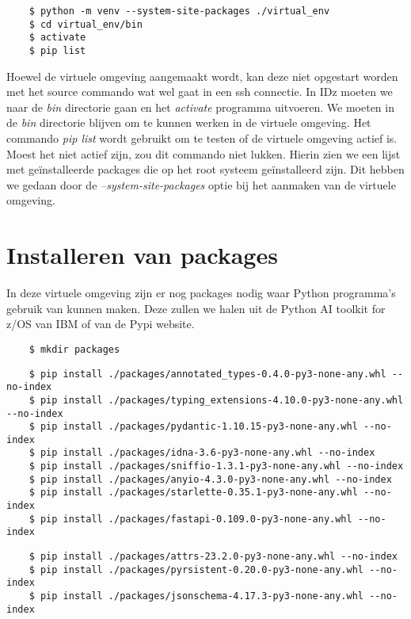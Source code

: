 \begin{lstlisting}
    $ python -m venv --system-site-packages ./virtual_env
    $ cd virtual_env/bin
    $ activate
    $ pip list
\end{lstlisting}

Hoewel de virtuele omgeving aangemaakt wordt, kan deze niet opgestart worden met het source commando wat wel gaat in een ssh connectie. In IDz moeten we naar de \textit{bin} directorie gaan en het \textit{activate} programma uitvoeren. We moeten in de \textit{bin} directorie blijven om te kunnen werken in de virtuele omgeving.
Het commando \textit{pip list} wordt gebruikt om te testen of de virtuele omgeving actief is. Moest het niet actief zijn, zou dit commando niet lukken. Hierin zien we een lijst met geïnstalleerde packages die op het root systeem geïnstalleerd zijn. Dit hebben we gedaan door de \textit{--system-site-packages} optie bij het aanmaken van de virtuele omgeving.

\section{Installeren van packages}
In deze virtuele omgeving zijn er nog packages nodig waar Python programma's gebruik van kunnen maken. Deze zullen we halen uit de Python AI toolkit for z/OS van IBM of van de Pypi website.

\begin{lstlisting}
    $ mkdir packages
\end{lstlisting}

\begin{lstlisting}
    $ pip install ./packages/annotated_types-0.4.0-py3-none-any.whl --no-index
    $ pip install ./packages/typing_extensions-4.10.0-py3-none-any.whl --no-index
    $ pip install ./packages/pydantic-1.10.15-py3-none-any.whl --no-index
    $ pip install ./packages/idna-3.6-py3-none-any.whl --no-index
    $ pip install ./packages/sniffio-1.3.1-py3-none-any.whl --no-index
    $ pip install ./packages/anyio-4.3.0-py3-none-any.whl --no-index
    $ pip install ./packages/starlette-0.35.1-py3-none-any.whl --no-index
    $ pip install ./packages/fastapi-0.109.0-py3-none-any.whl --no-index
\end{lstlisting}

\begin{lstlisting}
    $ pip install ./packages/attrs-23.2.0-py3-none-any.whl --no-index
    $ pip install ./packages/pyrsistent-0.20.0-py3-none-any.whl --no-index
    $ pip install ./packages/jsonschema-4.17.3-py3-none-any.whl --no-index
\end{lstlisting}

